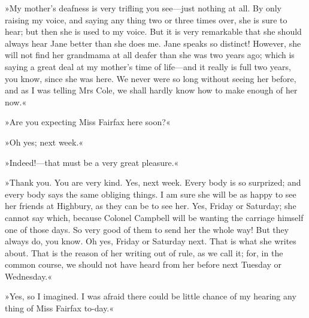 »My mother's deafness is very trifling you see—just nothing at all. By only raising my voice, and saying any thing two or three times over, she is sure to hear; but then she is used to my voice. But it is very remarkable that she should always hear Jane better than she does me. Jane speaks so distinct! However, she will not find her grandmama at all deafer than she was two years ago; which is saying a great deal at my mother's time of life—and it really is full two years, you know, since she was here. We never were so long without seeing her before, and as I was telling Mrs Cole, we shall hardly know how to make enough of her now.«

»Are you expecting Miss Fairfax here soon?«

»Oh yes; next week.«

»Indeed!—that must be a very great pleasure.«

»Thank you. You are very kind. Yes, next week. Every body is so surprized; and every body says the same obliging things. I am sure she will be as happy to see her friends at Highbury, as they can be to see her. Yes, Friday or Saturday; she cannot say which, because Colonel Campbell will be wanting the carriage himself one of those days. So very good of them to send her the whole way! But they always do, you know. Oh yes, Friday or Saturday next. That is what she writes about. That is the reason of her writing out of rule, as we call it; for, in the common course, we should not have heard from her before next Tuesday or Wednesday.«

»Yes, so I imagined. I was afraid there could be little chance of my hearing any thing of Miss Fairfax to-day.«

